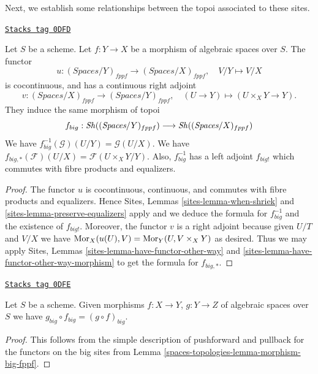 Next, we establish some relationships between the topoi
associated to these sites.

\begin{lemma}
\label{spaces-topologies-lemma-morphism-big-fppf}
\href{https://stacks.math.columbia.edu/tag/0DFD}{\texttt{Stacks tag 0DFD}}

Let $S$ be a scheme.
Let $f : Y \to X$ be a morphism of algebraic spaces over $S$.
The functor
$$
u : (\textit{Spaces}/Y)_{fppf} \longrightarrow (\textit{Spaces}/X)_{fppf},
\quad
V/Y \longmapsto V/X
$$
is cocontinuous, and has a continuous right adjoint
$$
v : (\textit{Spaces}/X)_{fppf} \longrightarrow (\textit{Spaces}/Y)_{fppf},
\quad
(U \to Y) \longmapsto (U \times_X Y \to Y).
$$
They induce the same morphism of topoi
$$
f_{big} :
\mathit{Sh}((\textit{Spaces}/Y)_{fppf})
\longrightarrow
\mathit{Sh}((\textit{Spaces}/X)_{fppf})
$$
We have $f_{big}^{-1}(\mathcal{G})(U/Y) = \mathcal{G}(U/X)$.
We have $f_{big, *}(\mathcal{F})(U/X) = \mathcal{F}(U \times_X Y/Y)$.
Also, $f_{big}^{-1}$ has a left adjoint $f_{big!}$ which commutes with
fibre products and equalizers.
\end{lemma}

\begin{proof}
The functor $u$ is cocontinuous, continuous, and commutes with fibre products
and equalizers. Hence
Sites, Lemmas \ref{sites-lemma-when-shriek} and
\ref{sites-lemma-preserve-equalizers}
apply and we deduce the formula
for $f_{big}^{-1}$ and the existence of $f_{big!}$. Moreover,
the functor $v$ is a right adjoint because given $U/T$ and $V/X$
we have $\operatorname{Mor}_X(u(U), V) = \operatorname{Mor}_Y(U, V \times_X Y)$
as desired. Thus we may apply
Sites, Lemmas \ref{sites-lemma-have-functor-other-way} and
\ref{sites-lemma-have-functor-other-way-morphism} to get the
formula for $f_{big, *}$.
\end{proof}

\begin{lemma}
\label{spaces-topologies-lemma-composition-fppf}
\href{https://stacks.math.columbia.edu/tag/0DFE}{\texttt{Stacks tag 0DFE}}

Let $S$ be a scheme. Given morphisms $f : X \to Y$, $g : Y \to Z$
of algebraic spaces over $S$ we have
$g_{big} \circ f_{big} = (g \circ f)_{big}$.
\end{lemma}

\begin{proof}
This follows from the simple description of pushforward
and pullback for the functors on the big sites from
Lemma \ref{spaces-topologies-lemma-morphism-big-fppf}.
\end{proof}

